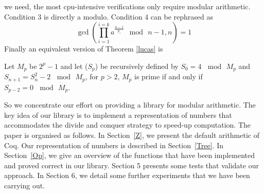 we need, the most cpu-intensive verifications only require modular arithmetic.  
Condition 3 is directly a modulo. Condition 4 can be rephrased as
$$
\gcd(\prod_{i=1}^{i=k}a^{\frac{n-1}{p_i}} \mod\, n -1,n) = 1
$$
Finally an equivalent version of Theorem \ref{lucas} is
\begin{theorem}
Let $M_p$ be $2^p-1$ and let  ($S_p$) be recursively defined by $S_0= 4\, \mod\, M_p$ and $S_{n+1} = S_n^2 - 2\, \mod\, M_p$,
for $p > 2$, $M_p$ is prime if and only if $S_{p-2} = 0\, \mod\, M_p $.
\end{theorem}
 So we concentrate our effort on providing a library for modular arithmetic. The key idea of our
 library is to implement a representation of numbers that accommodates the divide and
 conquer strategy to speed-up computation. The paper is organised as follows. 
 In Section~\ref{Z}, we present the default arithmetic of {\sc Coq}.
 Our representation of numbers is described in Section~\ref{Tree}. In Section~\ref{Op}, we 
 give an overview of the functions that have been implemented and proved
 correct in our library. Section 5 presents some tests that validate our approach.
 In Section 6, we detail some further experiments that we have been carrying out.